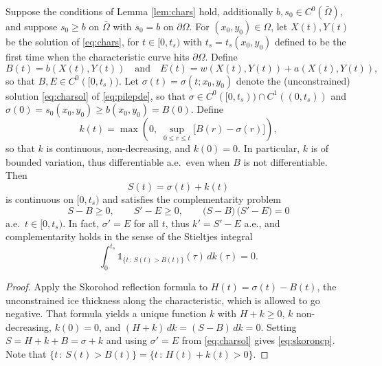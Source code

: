 \documentclass[hidelinks,onefignum,onetabnum,final]{siamart220329}  %
\newcommand{\one}{\mathds{1}}
\begin{document}
\begin{lemma} \label{lem:skoro}  Suppose the conditions of Lemma \ref{lem:chars} hold, additionally $b,s_0 \in C^0(\bar\Omega)$, and suppose $s_0 \ge b$ on $\bar\Omega$ with $s_0=b$ on $\partial \Omega$.  For $(x_0,y_0) \in \Omega$, let $X(t),Y(t)$ be the solution of \eqref{eq:chars}, for $t\in[0,t_s)$ with $t_s=t_s(x_0,y_0)$ defined to be the first time when the characteristic curve hits $\partial\Omega$.  Define
\begin{equation}
B(t) = b(X(t),Y(t)) \quad \text{and} \quad E(t)=w(X(t),Y(t)) + a(X(t),Y(t)), \label{eq:skorodefBE}
\end{equation}
so that $B,E\in C^0([0,t_s))$.  Let $\sigma(t) = \sigma(t;x_0,y_0)$ denote the (unconstrained) solution \eqref{eq:charsol} of \eqref{eq:pilepde}, so that $\sigma \in C^0([0,t_s)) \cap C^1((0,t_s))$ and $\sigma(0)=s_0(x_0,y_0) \ge b(x_0,y_0) = B(0)$.  Define
\begin{equation}
k(t) = \max\!\left(0,\; \sup_{0 \le r \le t}\!\Big[B(r) - \sigma(r)\Big]\right),  \label{eq:skoro}
\end{equation}
so that $k$ is continuous, non-decreasing, and $k(0) = 0$.  In particular, $k$ is of bounded variation, thus differentiable a.e.~even when $B$ is not differentiable.  Then
\begin{equation}
S(t) = \sigma(t) + k(t)
\end{equation}
is continuous on $[0,t_s)$ and satisfies the complementarity problem
\begin{equation}
S - B \ge 0, \qquad S' - E \ge 0, \qquad \big(S - B\big)\,\big(S' - E\big) = 0  \label{eq:skoroncp}
\end{equation}
a.e.~$t\in [0,t_s)$.  In fact, $\sigma'=E$ for all $t$, thus $k'=S'-E$ a.e., and complementarity holds in the sense of the Stieltjes integral
\begin{equation}
\int_0^{t_s} \one_{\{t\,:\,S(t) > B(t)\}}(\tau) \,dk(\tau) = 0.  \label{eq:skorostieltjes}
\end{equation}
\end{lemma}


\begin{proof}
Apply the Skorohod reflection formula \cite[Lemma 6.14]{KaratzasShreve1991} to $H(t) = \sigma(t) - B(t)$, the unconstrained ice thickness along the characteristic, which is allowed to go negative.  That formula yields a unique function $k$ with $H + k \ge 0$, $k$ non-decreasing, $k(0)=0$, and $(H+k)\,dk = (S-B)\,dk = 0$.  Setting $S = H + k + B = \sigma + k$ and using $\sigma' = E$ from \eqref{eq:charsol} gives \eqref{eq:skoroncp}.  Note that $\{t\,:\,S(t) > B(t)\} = \{t\,:\,H(t)+k(t)>0\}$.
\end{proof}
\end{document}
